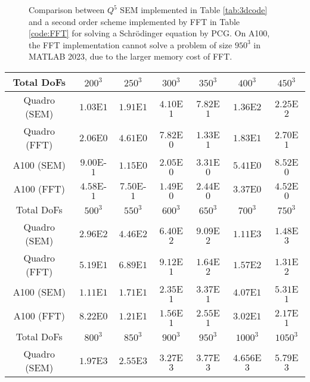 \documentclass{article}
\begin{document}
  \begin{figure}[ht!]
\caption{
Comparison between $Q^5$ SEM implemented in Table \ref{tab:3dcode} and a second order scheme implemented by FFT in Table \ref{code:FFT} for solving a Schr{\"o}dinger equation by PCG. On A100, the FFT implementation cannot solve a problem of size $950^3$ in MATLAB 2023, due to the larger memory cost of FFT.
}
	\label{fig:fft2}
 \end{figure}
 
\begin{table}[ht!]
    \centering
    \begin{tabular}{|c|c|c|c|c|c|c|}
    \hline
         Total DoFs & $200^3$ & $250^3$ & $300^3$ & $350^3$ & $400^3$ & $450^3$\\
    \hline
         Quadro (SEM) & $1.03$E$1$ & $1.91$E$1$ & $4.10$E$1$ & $7.82$E$1$ & $1.36$E$2$ &
         $2.25$E$2$\\
    \hline
         Quadro (FFT) & $2.06$E$0$ & $4.61$E$0$ & $7.82$E$0$ & $1.33$E$1$ & $1.83$E$1$ &
         $2.70$E$1$\\
    \hline
         A100 (SEM) & $9.00$E-$1$ & $1.15$E$0$ & $2.05$E$0$ & $3.31$E$0$ & $5.41$E$0$ &
         $8.52$E$0$\\
    \hline
         A100 (FFT) & $4.58$E-$1$ & $7.50$E-$1$ & $1.49$E$0$ & $2.44$E$0$ & $3.37$E$0$ &
         $4.52$E$0$\\
    \hline
    \hline
         Total DoFs & $500^3$ & $550^3$ & $600^3$ & $650^3$ & $700^3$ & $750^3$\\
    \hline
         Quadro (SEM) & $2.96$E$2$ & $4.46$E$2$ & $6.40$E$2$ & $9.09$E$2$ & $1.11$E$3$ &
         $1.48$E$3$\\
    \hline
         Quadro (FFT) & $5.19$E$1$ & $6.89$E$1$ & $9.12$E$1$ & $1.64$E$2$ & $1.57$E$2$ &
         $1.31$E$2$\\
    \hline
         A100 (SEM) & $1.11$E$1$ & $1.71$E$1$ & $2.35$E$1$ & $3.37$E$1$ & $4.07$E$1$ &
         $5.31$E$1$\\
    \hline
         A100 (FFT) & $8.22$E$0$ & $1.21$E$1$ & $1.56$E$1$ & $2.55$E$1$ & $3.02$E$1$ & $2.17$E$1$\\
    \hline
    \hline
         Total DoFs & $800^3$ & $850^3$ & $900^3$ & $950^3$ & $1000^3$ & $1050^3$\\
    \hline
         Quadro (SEM) & $1.97$E$3$ & $2.55$E$3$ & $3.27$E$3$ & $3.77$E$3$ & $4.656$E$3$ & $5.79$E$3$\\

\end{tabular}
\end{table}
\end{document}
